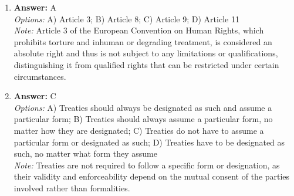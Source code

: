 \documentclass[12pt]{article}
\begin{document}
\begin{enumerate}[label=\arabic*.]
\item \textbf{Answer:} A
\\ \textit{Options:} A) Article 3; B) Article 8; C) Article 9; D) Article 11
\\ \textit{Note:} Article 3 of the European Convention on Human Rights, which prohibits torture and inhuman or degrading treatment, is considered an absolute right and thus is not subject to any limitations or qualifications, distinguishing it from qualified rights that can be restricted under certain circumstances.
\item \textbf{Answer:} C
\\ \textit{Options:} A) Treaties should always be designated as such and assume a particular form; B) Treaties should always assume a particular form, no matter how they are designated; C) Treaties do not have to assume a particular form or designated as such; D) Treaties have to be designated as such, no matter what form they assume
\\ \textit{Note:} Treaties are not required to follow a specific form or designation, as their validity and enforceability depend on the mutual consent of the parties involved rather than formalities.
\end{enumerate}
\end{document}
